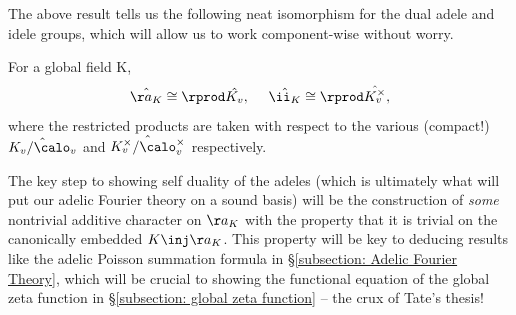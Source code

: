 \documentclass[11pt, x11names, openany]{book}
\begin{document}
The above result tells us the following neat isomorphism for the dual adele and idele groups, which will allow us to work component-wise without worry.

\begin{corollary}
    \label{cor: adeles and ideles dual commutes w resprod}
    For a global field K,
    \begin{equation*}
        \hat{\aa_K} \cong \rprod \hat{K_v}, \quad \ \hat{\ii_K} \cong \rprod \hat{K_v^\times}, 
    \end{equation*}
    where the restricted products are taken with respect to the various (compact!) $\hat{K_v/\calo_v}$ and $\hat{K_v^\times /\calo_v^\times}$ respectively.
\end{corollary}

The key step to showing self duality of the adeles (which is ultimately what will put our adelic Fourier theory on a sound basis) will be the construction of \textit{some} nontrivial additive character on $\aa_K$ with the property that it is trivial on the canonically embedded $K \inj \aa_K$.  This property will be key to deducing results like the adelic Poisson summation formula in \S \ref{subsection: Adelic Fourier Theory}, which will be crucial to showing the functional equation of the global zeta function in \S \ref{subsection: global zeta function} -- the crux of Tate's thesis!
\end{document}
